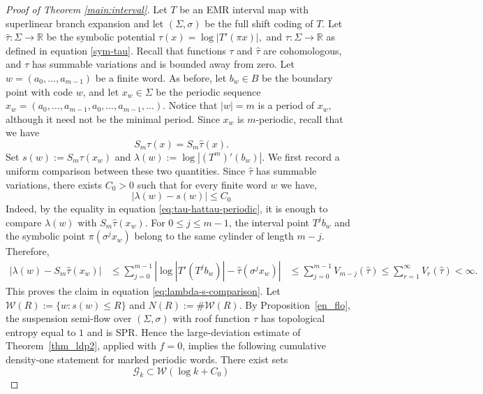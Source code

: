 \documentclass[letterpaper,11pt]{amsart}
\numberwithin{equation}{section}     %
\newcommand{\R}{\mathbb{R}}
\def\R{{\mathbb R}}
\def\le{\leqslant}
\begin{document}
\begin{proof}[Proof of Theorem \ref{main:interval}]
Let $T$ be an EMR interval map with superlinear branch expansion and let $(\Sigma,\sigma)$ be the full shift
coding of $T$. Let $\widehat\tau:\Sigma\to\mathbb R$ be the symbolic potential $\widehat\tau(x)=\log |T'(\pi x)|,$
and $\tau:\Sigma \to \R$ as defined in equation \eqref{sym-tau}. Recall that functions $\tau$ and $\widehat\tau$ are cohomologous, and $\tau$ has summable variations and is
bounded away from zero.  Let $w=(a_0,\ldots,a_{m-1})$ be a finite word. As before,  let $b_w\in B$ be the boundary point with code $w$, and let
$x_w\in\Sigma$ be the periodic sequence $x_w=(a_0,\ldots,a_{m-1},a_0,\ldots,a_{m-1},\ldots).$
Notice that $|w|=m$ is a period of $x_w$, although it need not be
the minimal period. Since $x_w$ is $m$-periodic, recall  that we have
\begin{equation}\label{eq:tau-hattau-periodic}
        S_m\tau(x)=S_m\widehat\tau(x).
\end{equation}
Set  $s(w):=S_m\tau(x_w)$ and $\lambda(w):=\log |(T^m)'(b_w)|$.  We first record a uniform comparison between these two quantities. Since
$\widehat\tau$ has summable variations, there exists $C_0>0$ such that for every finite word $w$ we have,
\begin{equation}\label{eq:lambda-s-comparison}
        |\lambda(w)-s(w)|\le C_0
   \end{equation}
Indeed, by the equality in equation \eqref{eq:tau-hattau-periodic}, it is enough to compare
$\lambda(w)$ with $S_m\widehat\tau(x_w)$. For $0\le j\le m-1$, the interval
point $T^j b_w$ and the symbolic point $\pi(\sigma^j x_w)$ belong to the same
cylinder of length $m-j$. Therefore,
\[
\begin{aligned}
 |\lambda(w)-S_m\widehat\tau(x_w)|
 &\le
 \sum_{j=0}^{m-1}
 \left|
      \log |T'(T^j b_w)|
      -\widehat\tau(\sigma^j x_w)
 \right| 
 &\le
 \sum_{j=0}^{m-1} V_{m-j}(\widehat\tau)
 \le
 \sum_{r=1}^{\infty} V_r(\widehat\tau)<\infty .
\end{aligned}
\]
This proves the claim in equation \eqref{eq:lambda-s-comparison}.    Let $\mathcal W(R):=\{w:s(w)\le R\}$ and $N(R):=\#\mathcal W(R).$
By Proposition~\ref{en_flo}, the suspension semi-flow over $(\Sigma,\sigma)$
with roof function $\tau$ has topological entropy equal to $1$ and is SPR.
Hence the large-deviation estimate of Theorem~\ref{thm_ldp2}, applied with
$f=0$, implies the following cumulative density-one statement for marked
periodic words. There exist sets
\[
        \mathcal G_k\subset \mathcal W(\log k+C_0)
\]
\end{proof}
\end{document}
